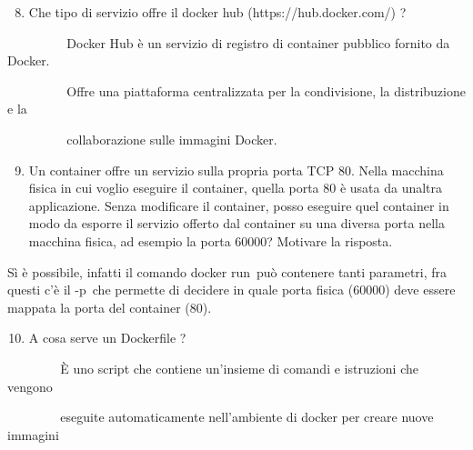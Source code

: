 \documentclass[
]{article}
\providecommand{\tightlist}{%
  \setlength{\itemsep}{0pt}\setlength{\parskip}{0pt}}
\begin{document}
{}

{}

{}

\begin{enumerate}
\setcounter{enumi}{7}
\tightlist
\item
  {Che tipo di servizio offre il docker hub (https://hub.docker.com/) ?}
\end{enumerate}

{}

{~ ~ ~ ~ ~ ~Docker Hub è un servizio di registro di container pubblico
fornito da Docker. ~}

{~ ~ ~ ~ ~ ~Offre una piattaforma centralizzata per la condivisione, la
distribuzione e la }

{~ ~ ~ ~ ~ ~collaborazione sulle immagini Docker.}

{}

{}

\begin{enumerate}
\setcounter{enumi}{8}
\tightlist
\item
  {Un container offre un servizio sulla propria porta TCP 80. Nella
  macchina fisica in cui voglio eseguire il container, quella porta 80 è
  usata da un\textquotesingle altra applicazione. Senza modificare il
  container, posso eseguire quel container in modo da esporre il
  servizio offerto dal container su una diversa porta nella macchina
  fisica, ad esempio la porta 60000? Motivare la risposta.}
\end{enumerate}

{}

{Sì è possibile, infatti il comando }{docker run}{~può contenere tanti
parametri, fra questi c'è il }{-p}{~che permette di decidere in quale
porta fisica (60000) deve essere mappata la porta del container (80).}

{}

{}

\begin{enumerate}
\setcounter{enumi}{9}
\tightlist
\item
  {A cosa serve un Dockerfile ?}
\end{enumerate}

{}

{~ ~ ~ ~ ~ È uno script che contiene un'insieme di comandi e istruzioni
che vengono}

{~ ~ ~ ~ ~ eseguite automaticamente nell'ambiente di docker per creare
nuove immagini}

{}

{}
\end{document}
